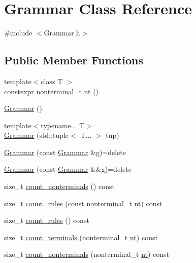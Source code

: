\hypertarget{class_grammar}{}\section{Grammar Class Reference}
\label{class_grammar}


{\ttfamily \#include $<$Grammar.\+h$>$}

\subsection*{Public Member Functions}
\begin{DoxyCompactItemize}
\item 
{\footnotesize template$<$class T $>$ }\\constexpr nonterminal\+\_\+t \hyperlink{class_grammar_aa5c9afa0e7e1aa989b54402b02a677a3}{nt} ()
\item 
\hyperlink{class_grammar_aa201250a002a7d07d398fee189a74427}{Grammar} ()
\item 
{\footnotesize template$<$typename... T$>$ }\\\hyperlink{class_grammar_a4e0a3b86d64eba75726b7355308c4649}{Grammar} (std\+::tuple$<$ T... $>$ tup)
\item 
\hyperlink{class_grammar_acfb7e4ea64210d03de896e300447e760}{Grammar} (const \hyperlink{class_grammar}{Grammar} \&g)=delete
\item 
\hyperlink{class_grammar_a28f97335602afe8b1a612679de2f80d9}{Grammar} (const \hyperlink{class_grammar}{Grammar} \&\&g)=delete
\item 
size\+\_\+t \hyperlink{class_grammar_abf841bc64ac19cb9872a8362f5e5731a}{count\+\_\+nonterminals} () const
\item 
size\+\_\+t \hyperlink{class_grammar_af25c47a2c5cae2a11720c8454e59290f}{count\+\_\+rules} (const nonterminal\+\_\+t \hyperlink{class_grammar_aa5c9afa0e7e1aa989b54402b02a677a3}{nt}) const
\item 
size\+\_\+t \hyperlink{class_grammar_af8f0fdd9cb368a608bee5626774360d4}{count\+\_\+rules} () const
\item 
size\+\_\+t \hyperlink{class_grammar_a7cf0515f3ca761590da05455a417896b}{count\+\_\+terminals} (nonterminal\+\_\+t \hyperlink{class_grammar_aa5c9afa0e7e1aa989b54402b02a677a3}{nt}) const
\item 
size\+\_\+t \hyperlink{class_grammar_a0714d68070749932d876fe868bde94bd}{count\+\_\+nonterminals} (nonterminal\+\_\+t \hyperlink{class_grammar_aa5c9afa0e7e1aa989b54402b02a677a3}{nt}) const
\item 

\end{DoxyCompactItemize}
